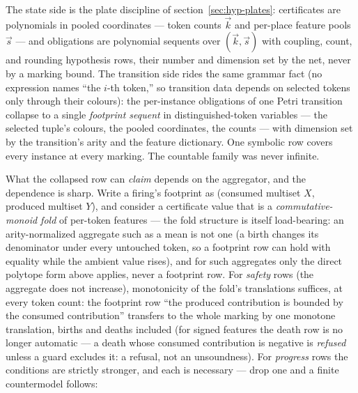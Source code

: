 The state side is the plate discipline of
section~\ref{sec:hyp-plates}: certificates are polynomials in pooled
coordinates --- token counts $\vec{k}$ and per-place feature pools
$\vec{s}$ --- and obligations are polynomial sequents over
$(\vec{k}, \vec{s})$ with coupling, count, and rounding hypothesis
rows, their number and dimension set by the net, never by a marking
bound. The transition side rides the same grammar fact
(no expression names ``the $i$-th token,'' so transition data
depends on selected tokens only through their colours): the
per-instance obligations of one Petri transition collapse to a
single \emph{footprint sequent} in distinguished-token variables ---
the selected tuple's colours, the pooled coordinates, the counts ---
with dimension set by the transition's arity and the feature
dictionary.
One symbolic row covers every instance at every marking. The
countable family was never infinite.

What the collapsed row can \emph{claim} depends on the aggregator,
and the dependence is sharp. Write a firing's footprint as
(consumed multiset $X$, produced multiset $Y$), and consider a
certificate value that is a \emph{commutative-monoid fold} of
per-token features --- the fold structure is itself load-bearing: an
arity-normalized aggregate such as a mean is not one (a birth
changes its denominator under every untouched token, so a footprint
row can hold with equality while the ambient value rises), and for
such aggregates only the direct polytope form above applies, never a
footprint row. For \emph{safety} rows (the aggregate does not
increase), monotonicity of the fold's translations suffices, at
every token count: the footprint row ``the produced contribution is
bounded by the consumed contribution'' transfers to the whole
marking by one monotone translation, births and deaths included (for
signed features the death row is no longer automatic --- a death
whose consumed contribution is negative is \emph{refused} unless a
guard excludes it: a refusal, not an unsoundness). For
\emph{progress} rows the conditions are strictly stronger, and each
is necessary --- drop one and a finite countermodel follows:

